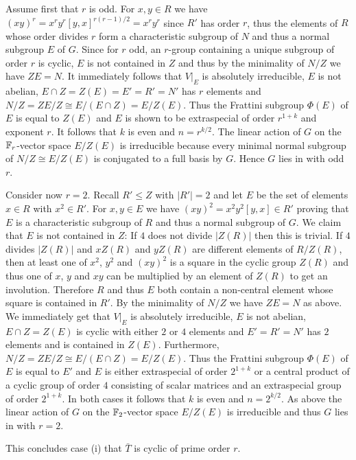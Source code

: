 Assume first that $r$ is odd. For $x,y \in R$ we have $(xy)^r =
x^ry^r[y,x]^{r(r-1)/2} = x^ry^r$ since $R'$ has order $r$, thus the
elements of $R$ whose order divides $r$ form a characteristic 
subgroup of $N$ and thus a normal subgroup $E$ of $G$. Since for
$r$ odd, an $r$-group containing a unique subgroup of order $r$ is
cyclic, $E$ is not contained in $Z$ and thus by the minimality
of $N/Z$ we have $Z E = N$. It immediately follows that $V|_E$
is absolutely irreducible, $E$ is not abelian, 
$E \cap Z = Z(E) = E' = R' = N'$ has $r$ elements and 
$N/Z = ZE/Z \cong E/(E \cap Z) = E/Z(E)$. Thus the Frattini subgroup
$\Phi(E)$ of $E$ is equal to $Z(E)$ and $E$ is shown to be extraspecial
of order $r^{1+k}$ and exponent $r$. It follows that $k$ is even and
$n=r^{k/2}$. The linear action of $G$ on
the $\mathbb{F}_r$-vector space $E/Z(E)$ is irreducible because every minimal
normal subgroup of $N/Z \cong E/Z(E)$ is conjugated to a full basis by
$G$. Hence $G$ lies in  with odd $r$.

Consider now $r=2$. Recall $R' \le Z$ with $|R'| = 2$ and
let $E$ be the set of elements $x \in R$ with $x^2 \in R'$. 
For $x,y \in E$ we have $(xy)^2 = x^2y^2[y,x] \in R'$ proving that
$E$ is a characteristic subgroup of $R$ and thus a normal subgroup of
$G$. We claim that $E$ is not contained in $Z$: If $4$ does not divide
$|Z(R)|$ then this is trivial. If $4$ divides $|Z(R)|$ and $xZ(R)$ and $yZ(R)$
are different elements of $R/Z(R)$, then at least one of
$x^2$, $y^2$ and $(xy)^2$ is a square in the cyclic group $Z(R)$ and
thus one of $x$, $y$ and $xy$ can be multiplied by an element of
$Z(R)$ to get an involution. Therefore $R$ and thus $E$ both contain a 
non-central element whose square is contained in $R'$.
By the minimality of $N/Z$ we have $Z E = N$ as above. We immediately
get that $V|_E$ is absolutely irreducible, $E$ is not abelian,
$E \cap Z = Z(E)$ is cyclic with either $2$ or $4$ elements and
$E' = R' = N'$ has $2$ elements and is contained in $Z(E)$.
Furthermore, $N/Z = ZE/Z \cong E/(E \cap Z) = E/Z(E)$. Thus the
Frattini subgroup $\Phi(E)$ of $E$ is equal to $E'$ and $E$ is either
extraspecial of order $2^{1+k}$ or a central product of a cyclic group
of order $4$ consisting of scalar matrices and an extraspecial group 
of order $2^{1+k}$. In both cases it follows that $k$ is even and
$n = 2^{k/2}$. As above the linear action of $G$ on the $\mathbb{F}_2$-vector space
$E/Z(E)$ is irreducible and thus $G$ lies in  with $r=2$.

This concludes case (i) that $\bar T$ is cyclic of prime order $r$.

